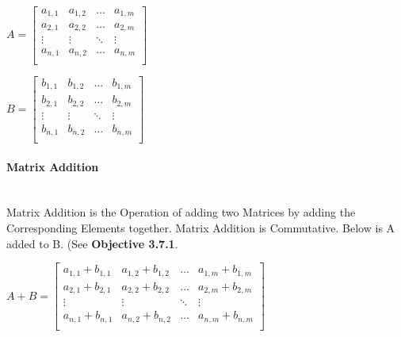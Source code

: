 \begin{flushleft}
                \begin{center}
                    $
                    A = 
                    \begin{bmatrix}
                        a_{1,1} & a_{1,2} & \hdots  & a_{1,m} \\
                        a_{2,1} & a_{2,2} & \hdots  & a_{2,m} \\
                        \vdots  & \vdots  & \ddots  & \vdots  \\
                        a_{n,1} & a_{n,2} & \hdots  & a_{n,m} \\
                    \end{bmatrix}
                    $
                \end{center}
                \vspace{0.2cm}
                \begin{center}
                    $
                    B = 
                    \begin{bmatrix}
                        b_{1,1} & b_{1,2} & \hdots  & b_{1,m} \\
                        b_{2,1} & b_{2,2} & \hdots  & b_{2,m} \\
                        \vdots  & \vdots  & \ddots  & \vdots  \\
                        b_{n,1} & b_{n,2} & \hdots  & b_{n,m} \\
                    \end{bmatrix}
                    $
                \end{center}

                \paragraph{Matrix Addition} \mbox{} \\
                    \vspace{0.2cm}
                    Matrix Addition is the Operation of adding two Matrices by adding the Corresponding Elements together. Matrix Addition is Commutative. 
                    Below is A added to B. (See \textbf{Objective 3.7.1}.\\

                    \begin{center}
                        $
                        A + B =
                        \begin{bmatrix}
                            a_{1,1} + b_{1,1} & a_{1,2} + b_{1,2} & \hdots  & a_{1,m} + b_{1,m} \\
                            a_{2,1} + b_{2,1} & a_{2,2} + b_{2,2} & \hdots  & a_{2,m} + b_{2,m} \\
                            \vdots            & \vdots            & \ddots  & \vdots            \\
                            a_{n,1} + b_{n,1} & a_{n,2} + b_{n,2} & \hdots  & a_{n,m} + b_{n,m} \\
                        \end{bmatrix}
                        $
                    \end{center}


\end{flushleft}
